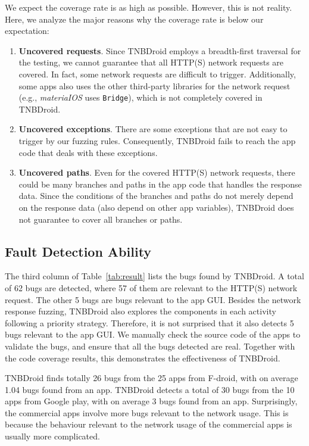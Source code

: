 \documentclass[sigconf,review, anonymous]{acmart}
\begin{document}
We expect the coverage rate is as high as possible. However, this is not reality. Here, we analyze the major reasons why the coverage rate is below our expectation:
\begin{enumerate}
\item \textbf{Uncovered requests}. Since \textsf{TNBDroid} employs a breadth-first traversal for the testing, we cannot guarantee that all HTTP(S) network requests are covered. In fact, some network requests are difficult to trigger. Additionally, some apps also uses the other third-party libraries for the network request (e.g., \textit{materiaIOS} uses \texttt{Bridge}), which is not completely covered in \textsf{TNBDroid}. 
\item \textbf{Uncovered exceptions}. There are some exceptions that are not easy to trigger by our fuzzing rules. Consequently, \textsf{TNBDroid} fails to reach the app code that deals with these exceptions. 
\item \textbf{Uncovered paths}. Even for the covered HTTP(S) network requests, there could be many branches and paths in the app code that handles the response data. Since the conditions of the branches and paths do not merely depend on the response data (also depend on other app variables), \textsf{TNBDroid} does not guarantee to cover all branches or paths.  
\end{enumerate} 


\subsection{Fault Detection Ability}
The third column of Table~\ref{tab:result} lists the bugs found by \textsf{TNBDroid}. A total of 62 bugs are detected, where 57 of them are relevant to the HTTP(S) network request. The other 5 bugs are bugs relevant to the app GUI. Besides the network response fuzzing,  \textsf{TNBDroid} also explores the components in each activity following a priority strategy. Therefore, it is not surprised that it also detects 5 bugs relevant to the app GUI. We manually check the source code of the apps to validate the bugs, and ensure that all the bugs detected are real. Together with the code coverage results, this demonstrates the effectiveness of \textsf{TNBDroid}. 

\textsf{TNBDroid} finds totally 26 bugs from the 25 apps from F-droid, with on average 1.04 bugs found from an app. \textsf{TNBDroid} detects a total of 30 bugs from the 10 apps from Google play, with on average 3 bugs found from an app. Surprisingly, the commercial apps involve more bugs relevant to the network usage. This is because the behaviour relevant to the network usage of the commercial apps is usually more complicated. 
\end{document}
